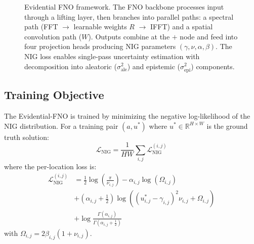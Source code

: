 \begin{figure}[htbp]
{\begin{tikzpicture}



\end{tikzpicture}%
}
\caption{Evidential FNO framework. The FNO backbone processes input through a lifting layer, then branches into parallel paths: a spectral path (FFT $\rightarrow$ learnable weights $R$ $\rightarrow$ IFFT) and a spatial convolution path ($W$). Outputs combine at the $+$ node and feed into four projection heads producing NIG parameters $(\gamma, \nu, \alpha, \beta)$. The NIG loss enables single-pass uncertainty estimation with decomposition into aleatoric ($\sigma^2_{\text{ale}}$) and epistemic ($\sigma^2_{\text{epi}}$) components.}
\label{fig:evidential_framework}
\end{figure}

\subsection{Training Objective}

The Evidential-FNO is trained by minimizing the negative log-likelihood of the NIG distribution. For a 
training pair $(a, u^*)$ where $u^* \in \mathbb{R}^{H \times W}$ is the ground truth solution:
\begin{equation}
    \mathcal{L}_{\text{NIG}} = \frac{1}{HW} \sum_{i,j} \mathcal{L}^{(i,j)}_{\text{NIG}}
\end{equation}
where the per-location loss is:
\begin{align}
    \mathcal{L}^{(i,j)}_{\text{NIG}} &= \frac{1}{2}\log\left(\frac{\pi}{\nu_{i,j}}\right) - \alpha_{i,j}\log(\Omega_{i,j}) \nonumber \\
    &+ \left(\alpha_{i,j} + \frac{1}{2}\right)\log\left((u^*_{i,j} - \gamma_{i,j})^2 \nu_{i,j} + \Omega_{i,j}\right) \nonumber \\
    &+ \log\frac{\Gamma(\alpha_{i,j})}{\Gamma(\alpha_{i,j} + \frac{1}{2})}
\end{align}
with $\Omega_{i,j} = 2\beta_{i,j}(1 + \nu_{i,j})$.

